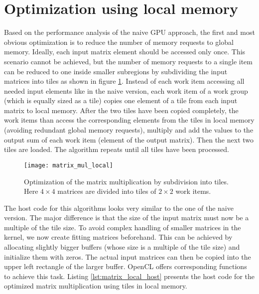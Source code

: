 \section{Optimization using local memory}
\label{sec:matrix_mul_local}
Based on the performance analysis of the naive GPU approach, the first and most obvious optimization is to reduce the number of memory requests to global memory. Ideally, each input matrix element should be accessed only once. This scenario cannot be achieved, but the number of memory requests to a single item can be reduced to one inside smaller subregions by subdividing the input matrices into tiles as shown in figure \ref{fig:matrix_mul_local}. Instead of each work item accessing all needed input elements like in the naive version, each work item of a work group (which is equally sized as a tile) copies one element of a tile from each input matrix to local memory. After the two tiles have been copied completely, the work items than access the corresponding elements from the tiles in local memory (avoiding redundant global memory requests), multiply and add the values to the output sum of each work item (element of the output matrix). Then the next two tiles are loaded. The algorithm repeats until all tiles have been processed.

\begin{figure}[h]
\centering
\texttt{[image: matrix\_mul\_local]}
\caption{Optimization of the matrix multiplication by subdivision into tiles. Here $4 \times 4$ matrices are divided into tiles of $2 \times 2$ work items.}
\label{fig:matrix_mul_local}
\end{figure}

The host code for this algorithms looks very similar to the one of the naive version. The major difference is that the size of the input matrix must now be a multiple of the tile size. To avoid complex handling of smaller matrices in the kernel, we now create fitting matrices beforehand. This can be achieved by allocating slightly bigger buffers (whose size is a multiple of the tile size) and initialize them with zeros. The actual input matrices can then be copied into the upper left rectangle of the larger buffer. OpenCL offers corresponding functions to achieve this task. Listing \ref{lst:matrix_local_host} presents the host code for the optimized matrix multiplication using tiles in local memory.

\pagebreak



